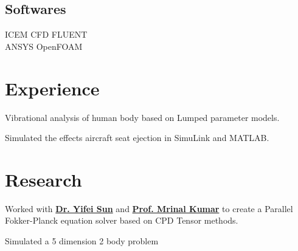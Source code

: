 \documentclass[]{resume}
\begin{document}
\begin{minipage}[t]{0.33\textwidth}
\subsection{Softwares}
ICEM CFD \textbullet{} FLUENT \textbullet{} \\
ANSYS \textbullet{} OpenFOAM \\
\sectionsep

%
%

\end{minipage}
\hfill
\begin{minipage}[t]{0.66\textwidth}


\section{Experience}
\sectionsep

\vspace{\topsep} %
\begin{tightemize}
\item Vibrational analysis of human body based on Lumped parameter models.
\item Simulated the effects aircraft seat ejection in SimuLink and MATLAB.
\end{tightemize}
\sectionsep


\section{Research}
\begin{tightemize}
\item Worked with \textbf{\href{http://plaza.ufl.edu/yfsun/index.html}{Dr. Yifei Sun}} and
	\textbf{\href{http://web.mae.ufl.edu/~mrinalkumar/index.html}{Prof. Mrinal Kumar}} to create a Parallel
	Fokker-Planck equation solver based on CPD Tensor methods.
\item Simulated a 5 dimension 2 body problem
\end{tightemize}


\end{minipage}
\end{document}
